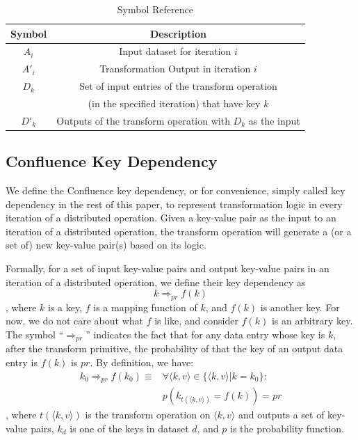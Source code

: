 \documentclass[10pt,journal,compsoc]{IEEEtran}
\begin{document}
\begin{table}[!t]
\renewcommand{\arraystretch}{1}
\caption{Symbol Reference}\label{table:symbol}
\centering
\begin{tabularx}{0.49\textwidth}{ c | c }
\hline
\textbf{Symbol} & \textbf{Description}  \\
\hline
$A_i$ & Input dataset for iteration $i$\\
\hline
$A'_i$  & Transformation Output in iteration $i$   \\
\hline
$D_k$ & Set of input entries of the transform operation \\
&(in the specified iteration) that have key $k$\\
\hline
$D'_k$ & Outputs of the transform operation with $D_k$ as the input\\
\hline
\end{tabularx}
\end{table}

\subsection{Confluence Key Dependency}\label{section:dependency}
We define the Confluence key dependency, or for convenience, 
simply called key dependency in the rest of this paper,
to represent transformation logic in every iteration
of a distributed operation. 
Given a key-value pair as the input to an iteration of a distributed operation,
the transform operation will generate a (or a set of) new key-value pair(s) based on its logic. 


Formally, for a set of input key-value pairs and output key-value pairs 
in an iteration of a distributed operation, 
we define their key dependency as 
\begin{equation}\label{eq:dependency}
k \Rightarrow_{pr} f(k)
\end{equation}
, where $k$ is a key, 
$f$ is a mapping function of $k$, 
and $f(k)$ is another key. 
For now, we do not care about what $f$ is like, and consider $f(k)$
is an arbitrary key. 
The symbol ``$\Rightarrow_{pr}$'' indicates the fact that 
for any data entry whose key is $k$, after the transform primitive, 
the probability of that the key of an output data entry is $f(k)$ is $pr$.
By definition, we have:
\begin{equation*}\label{eq:dependencyDefine}
\begin{aligned}
k_0 \Rightarrow_{pr} f(k_0) \equiv 
& \forall \langle k,v \rangle \in \{ \langle k,v \rangle | k = k_0\}: \\
& p(k_{t( \langle k,v \rangle)} = f(k)) = pr
\end{aligned}
\end{equation*}
, where $t(\langle k,v \rangle)$ is the transform operation on $\langle k,v \rangle$ and outputs 
a set of key-value pairs, $k_d$ is one of the keys in dataset $d$,
and $p$ is the probability function. 
\end{document}
